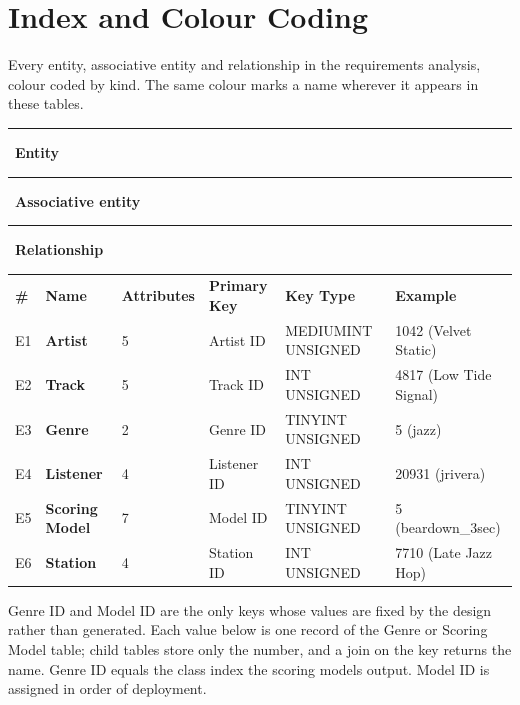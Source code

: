 \documentclass[11pt]{article}
\newcommand{\ent}[1]{\textcolor{entc}{\textbf{#1}}}
\newcommand{\asc}[1]{\textcolor{ascc}{\textbf{#1}}}
\newcommand{\rel}[1]{\textcolor{relc}{\textbf{#1}}}
\newcommand{\swatch}[1]{\textcolor{#1}{\rule{0.9em}{0.9em}}}
\begin{document}
\clearpage

\section{Index and Colour Coding}\label{sec:index}

Every entity, associative entity and relationship in the requirements analysis, colour coded by kind.
The same colour marks a name wherever it appears in these tables.

\swatch{entc}\ \ent{Entity}\qquad
\swatch{ascc}\ \asc{Associative entity}\qquad
\swatch{relc}\ \rel{Relationship}

\begin{longtable}{|L{0.35in}|L{1.25in}|L{0.80in}|L{1.05in}|T{1.30in}|L{1.20in}|}
\hline
{} \\ \hline
{}\textbf{\#} & \textbf{Name} & \textbf{Attributes} & \textbf{Primary Key} & \textbf{Key Type} & \textbf{Example} \\ \hline
E1 & \ent{Artist} & 5 & Artist ID & MEDIUMINT UNSIGNED & 1042 (Velvet Static) \\ \hline
E2 & \ent{Track} & 5 & Track ID & INT UNSIGNED & 4817 (Low Tide Signal) \\ \hline
E3 & \ent{Genre} & 2 & Genre ID & TINYINT UNSIGNED & 5 (jazz) \\ \hline
E4 & \ent{Listener} & 4 & Listener ID & INT UNSIGNED & 20931 (jrivera) \\ \hline
E5 & \ent{Scoring Model} & 7 & Model ID & TINYINT UNSIGNED & 5 (beardown\_3sec) \\ \hline
E6 & \ent{Station} & 4 & Station ID & INT UNSIGNED & 7710 (Late Jazz Hop) \\ \hline
\end{longtable}

Genre ID and Model ID are the only keys whose values are fixed by the design rather than
generated. Each value below is one record of the Genre or Scoring Model table; child tables
store only the number, and a join on the key returns the name. Genre ID equals the class
index the scoring models output. Model ID is assigned in order of deployment.
\end{document}
